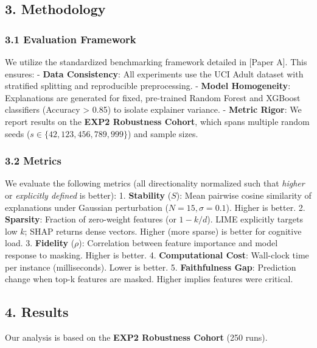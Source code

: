 \documentclass[
]{article}
\begin{document}
\hypertarget{methodology}{%
\subsection{3. Methodology}\label{methodology}}

\hypertarget{evaluation-framework}{%
\subsubsection{3.1 Evaluation Framework}\label{evaluation-framework}}

We utilize the standardized benchmarking framework detailed in {[}Paper
A{]}. This ensures: - \textbf{Data Consistency}: All experiments use the
UCI Adult dataset with stratified splitting and reproducible
preprocessing. - \textbf{Model Homogeneity}: Explanations are generated
for fixed, pre-trained Random Forest and XGBoost classifiers (Accuracy
\textgreater{} 0.85) to isolate explainer variance. - \textbf{Metric
Rigor}: We report results on the \textbf{EXP2 Robustness Cohort}, which
spans multiple random seeds (\(s \in \{42, 123, 456, 789, 999\}\)) and
sample sizes.

\hypertarget{metrics}{%
\subsubsection{3.2 Metrics}\label{metrics}}

We evaluate the following metrics (all directionality normalized such
that \emph{higher} or \emph{explicitly defined} is better): 1.
\textbf{Stability} (\(S\)): Mean pairwise cosine similarity of
explanations under Gaussian perturbation (\(N=15, \sigma=0.1\)). Higher
is better. 2. \textbf{Sparsity}: Fraction of zero-weight features (or
\(1 - k/d\)). LIME explicitly targets low \(k\); SHAP returns dense
vectors. Higher (more sparse) is better for cognitive load. 3.
\textbf{Fidelity} (\(\rho\)): Correlation between feature importance and
model response to masking. Higher is better. 4. \textbf{Computational
Cost}: Wall-clock time per instance (milliseconds). Lower is better. 5.
\textbf{Faithfulness Gap}: Prediction change when top-k features are
masked. Higher implies features were critical.

\hypertarget{results}{%
\subsection{4. Results}\label{results}}

Our analysis is based on the \textbf{EXP2 Robustness Cohort} (250 runs).
\end{document}
